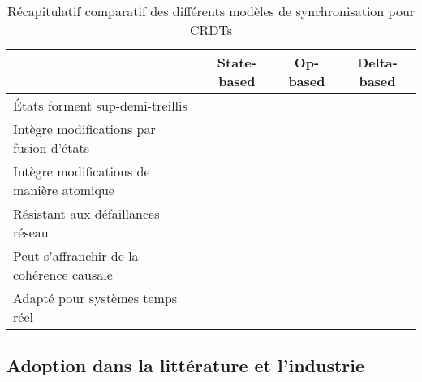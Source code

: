 \documentclass[12pt]{thesul}
\renewcommand{\checkmark}{\ding{51}}
\newcommand{\ballotx}{\ding{55}}
\begin{document}
\begin{table}[!ht]
  \centering
  \caption{Récapitulatif comparatif des différents modèles de synchronisation pour \acp{CRDT}}
  \label{tab:synchronisation-models}
    \begin{tabular}{lccc}
      \toprule
                                                & State-based & Op-based    & Delta-based \\
      \midrule
      États forment sup-demi-treillis           & \checkmark  & \checkmark  & \checkmark  \\
      Intègre modifications par fusion d'états  & \checkmark  & \ballotx    & \checkmark  \\
      Intègre modifications de manière atomique & \ballotx    & \checkmark  & \checkmark  \\
      Résistant aux défaillances réseau         & \checkmark  & \ballotx    & \checkmark  \\
      Peut s'affranchir de la cohérence causale & \ballotx    & \checkmark  & \checkmark  \\
      Adapté pour systèmes temps réel           & \ballotx    & \checkmark  & \checkmark  \\
      \bottomrule
    \end{tabular}
\end{table}

\subsection{Adoption dans la littérature et l'industrie}
\end{document}
